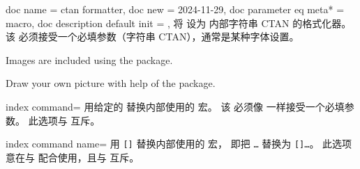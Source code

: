 \begin{docTcbKeys}
  {
    {
      doc name               = ctan formatter,
      doc new                = {2024-11-29},
      doc parameter eq meta* = macro,
      doc description default init = {}{},
    }
  }
将  设为  内部字符串 CTAN 的格式化器。
该  必须接受一个必填参数（字符串 CTAN），通常是某种字体设置。
\begin{dispExample}
Images are included using the  package.\par
\newcommand{\myformatter}[1]{\textbf{\ttfamily\color{red}\TeX-Archive}}
Draw your own picture with help of the  package.
\end{dispExample}
\end{docTcbKeys}



\begin{docTcbKey}[][doc new=2015-01-09]{index command}{=}{}
  用给定的  替换内部使用的  宏。
  该  必须像  一样接受一个必填参数。
  此选项与  互斥。
\begin{dispListing}
\end{dispListing}
\end{docTcbKey}


\begin{docTcbKey}[][doc new=2015-01-09]{index command name}{=}{\tcbdocdescNoDefaultInit}
  用 \mbox{\texttt{[]}} 替换内部使用的  宏，
  即把 \mbox{\texttt{\textbraceleft\ldots\textbraceright}} 替换为
  \mbox{\texttt{[]\textbraceleft\ldots\textbraceright}}。
  此选项意在与  配合使用，且与  互斥。
\begin{dispListing}
\end{dispListing}
\end{docTcbKey}

\clearpage

